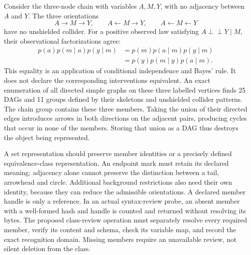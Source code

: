 Consider the three-node chain with variables \(A,M,Y\), with no adjacency
between \(A\) and \(Y\). The three orientations
\[
 A\longrightarrow M\longrightarrow Y,\qquad
 A\longleftarrow M\longrightarrow Y,\qquad
 A\longleftarrow M\longleftarrow Y
\]
have no unshielded collider. For a positive observed law satisfying
\(A\mathrel{\perp\!\!\!\perp}Y\mid M\), their observational factorizations agree:
\begin{align*}
 p(a)p(m\mid a)p(y\mid m)
 &=p(m)p(a\mid m)p(y\mid m)\\
 &=p(y)p(m\mid y)p(a\mid m).
\end{align*}
This equality is an application of conditional independence and Bayes' rule.
It does not declare the corresponding interventions equivalent. An exact
enumeration of all directed simple graphs on these three labelled vertices
finds 25 DAGs and 11 groups defined by their skeletons and unshielded collider
patterns. The chain group contains these three members. Taking the union of
their directed edges introduces arrows in both directions on the adjacent
pairs, producing cycles that occur in none of the members. Storing that union
as a DAG thus destroys the object being represented.
\citep{exec16_topology_exact}

A set representation should preserve member identities or a precisely defined
equivalence-class representation. An endpoint mark must retain its declared
meaning; adjacency alone cannot preserve the distinction between a tail,
arrowhead and circle. Additional background restrictions also need their own
identity, because they can reduce the admissible orientations. A declared
member handle is only a reference. In an actual syntax-review probe, an absent
member with a well-formed hash and handle is counted and returned without
resolving its bytes. The proposed class-review operation must separately
resolve every required member, verify its content and schema, check its
variable map, and record the exact recognition domain. Missing members require
an unavailable review, not silent deletion from the class.
\citep{exec16_topology_runtime}

